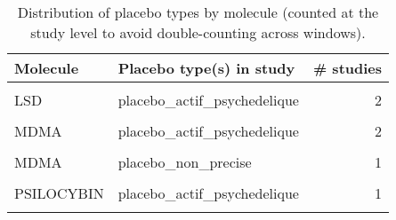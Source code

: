 \begin{table}[!h]
\centering
\caption{\label{tab:tab:placebo_distribution_by_study}Distribution of placebo types by molecule (counted at the study level to avoid double-counting across windows).}
\centering
\begin{tabular}[t]{llr}
\toprule
Molecule & Placebo type(s) in study & \# studies\\
\midrule
\cellcolor{gray!10}{AYAHUASCA} & \cellcolor{gray!10}{placebo\_inactif} & \cellcolor{gray!10}{2}\\
LSD & placebo\_actif\_psychedelique & 2\\
\cellcolor{gray!10}{LSD} & \cellcolor{gray!10}{placebo\_inactif} & \cellcolor{gray!10}{2}\\
MDMA & placebo\_actif\_psychedelique & 2\\
\cellcolor{gray!10}{MDMA} & \cellcolor{gray!10}{placebo\_inactif} & \cellcolor{gray!10}{7}\\
\addlinespace
MDMA & placebo\_non\_precise & 1\\
\cellcolor{gray!10}{PSILOCYBIN} & \cellcolor{gray!10}{placebo\_actif\_non\_psychedelique} & \cellcolor{gray!10}{1}\\
PSILOCYBIN & placebo\_actif\_psychedelique & 1\\
\cellcolor{gray!10}{PSILOCYBIN} & \cellcolor{gray!10}{placebo\_inactif} & \cellcolor{gray!10}{6}\\
\bottomrule
\end{tabular}
\end{table}
